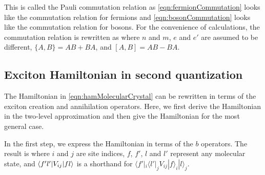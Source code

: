 This is called the Pauli commutation relation as \autoref{eqn:fermionCommutation} looks like the commutation relation for fermions  and \autoref{eqn:bosonCommutation} looks like the commutation relation for 
bosons. For the convenience
of calculations, the commutation relation is rewritten as
where $n$ and $m$, $e$ and $e'$ are assumed to be different, $\{ A, B\} = AB + BA$, and $[A, B] = AB - BA$. 

\subsection{Exciton Hamiltonian in second quantization}
\label{sec:excitonHam}

The Hamiltonian in \autoref{eqn:hamMolecularCrystal} can be rewritten in terms of the exciton creation and 
annihilation operators. Here, we first derive the Hamiltonian in the two-level approximation and then give
the Hamiltonian for the most general case.

In the first step, we express the Hamiltonian in terms of the $b$ operators. The result is\cite{zare-book}
where $i$ and $j$ are site indices, $f$, $f'$, $l$ and $l'$ represent any molecular state, and $\langle f' l' | V_{ij} | f l \rangle$ is a shorthand for $\langle f' |_{i} \langle l' |_{j}  V_{ij} | f\rangle_{i}  | l\rangle_{j}$. 

